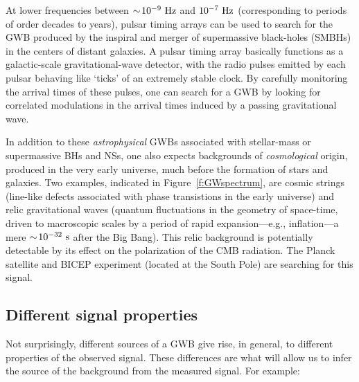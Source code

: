 \documentclass[11pt]{article}
\numberwithin{equation}{section}
\begin{document}
At lower frequencies between 
$\sim\!10^{-9}~{\rm Hz}$ and $10^{-7}~{\rm Hz}$
(corresponding to periods of order decades to years), 
pulsar timing arrays can be used to 
search for the GWB produced by the inspiral and merger 
of supermassive black-holes (SMBHs) in the centers of
distant galaxies.
A pulsar timing array basically functions as a 
galactic-scale gravitational-wave detector, with the
radio pulses emitted by each pulsar behaving like 
`ticks' of an extremely stable clock.
By carefully monitoring the arrival times of these
pulses, one can search for a GWB by looking for 
correlated modulations in the arrival times 
induced by a passing gravitational wave.

In addition to these {\em astrophysical} GWBs 
associated with stellar-mass or supermassive BHs 
and NSs, one also expects backgrounds of 
{\em cosmological} origin, produced in the 
very early universe, much before the formation of 
stars and galaxies.  
Two examples, indicated in Figure~\ref{f:GWspectrum}, 
are cosmic strings (line-like defects associated with 
phase transistions in the early universe) and
relic gravitational waves (quantum 
fluctuations in the geometry of space-time, 
driven to macroscopic scales by a period of rapid 
expansion---e.g., inflation---a mere 
$\sim\!10^{-32}~{\rm s}$ after the Big Bang).
This relic background is potentially detectable 
by its effect on the polarization of the CMB radiation.
The Planck satellite and BICEP experiment (located
at the South Pole) are searching for this signal.

\subsection{Different signal properties}

Not surprisingly, different sources of a GWB give
rise, in general, to different properties of the 
observed signal.
These differences are what will allow us to infer 
the source of the background from the measured signal.
For example:
\end{document}
